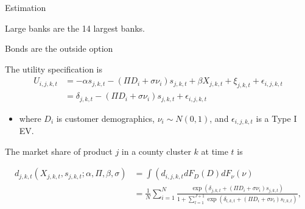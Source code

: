 \documentclass[notes,10pt, aspectratio=169]{beamer}
\newenvironment{wideitemize}{\itemize\addtolength{\itemsep}{10pt}}{\enditemize}
\begin{document}
\begin{frame}{Estimation}

        \vspace{0.3cm}
        \begin{wideitemize}
    
            \item Large banks are the 14 largest banks. 
            
            \item Bonds are the outside option
            \item The utility specification is
            $$
            \begin{aligned}
            U_{i, j, k, t} & =-\alpha s_{j, k, t}-\left(\Pi D_i+\sigma \nu_i\right) s_{j, k, t}+\beta X_{j, k, t}+\xi_{j, k, t}+\epsilon_{i, j, k, t} \\
            & =\delta_{j, k, t}-\left(\Pi D_i+\sigma \nu_i\right) s_{j, k, t}+\epsilon_{i, j, k, t}
            \end{aligned}
            $$

    \begin{itemize}
        \item where $D_i$ is customer demographics, $\nu_i \sim N(0,1)$, and $\epsilon_{i, j, k, t}$ is a Type I EV.
    \end{itemize}
    \item The market share of product $j$ in a county cluster $k$ at time $t$ is

    $$
    \begin{aligned}
    d_{j, k, t}\left(X_{j, k, t}, s_{j, k, t} ; \alpha, \Pi, \beta, \sigma\right) & =\int\left(d_{i, j, k, t} d F_D(D) d F_\nu(\nu)\right. \\
    & =\frac{1}{N} \sum_{i=1}^N \frac{\exp \left(\delta_{j, k, t}+\left(\Pi D_i+\sigma \nu_i\right) s_{j, k, t}\right)}{1+\sum_{l=1}^{J+1} \exp \left(\delta_{l, k, t}+\left(\Pi D_i+\sigma \nu_i\right) s_{l, k, t}\right)},
    \end{aligned}
    $$
    
    \end{wideitemize}

\end{frame}
\end{document}
